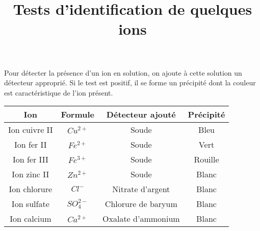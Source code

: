 \documentclass[a4paper, 14pt]{article}
\title{Tests d'identification de quelques ions}
\date{}
\begin{document}
	
\maketitle

Pour détecter la présence d'un ion en solution, on ajoute à cette solution un détecteur approprié. Si le test est positif, il se forme un précipité dont la couleur est caractéristique de l'ion présent.

\begin{huge}
	
\begin{center}
	
\begin{tabular}{|@{\ }c@{\ }|@{\ }c@{\ }|@{\ }c@{\ }|@{\ }c@{\ }|}
	\hline
	\textbf{Ion} & \textbf{Formule} & \textbf{Détecteur ajouté} & \textbf{Précipité} \\
	
	\hline
	Ion cuivre II & $Cu^{2+}$ & Soude & Bleu \\
	\hline
	Ion fer II & $Fe^{2+}$ & Soude & Vert \\
	\hline
	Ion fer III & $Fe^{3+}$ & Soude & Rouille \\
	\hline
	Ion zinc II & $Zn^{2+}$ & Soude & Blanc \\
	\hline
	Ion chlorure & $Cl^{-}$ & Nitrate d'argent & Blanc \\
	\hline
	Ion sulfate & $SO_{4}^{2-}$ & Chlorure de baryum & Blanc \\
	\hline
	Ion calcium & $Ca^{2+}$ & Oxalate d'ammonium & Blanc \\
	\hline
\end{tabular}
\end{center}
\end{huge}
\end{document}
